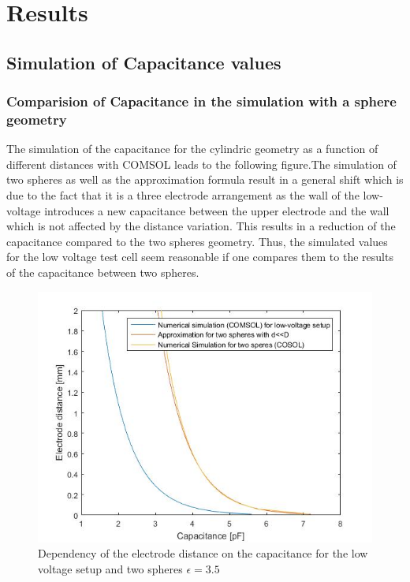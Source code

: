 
\chapter{Results}
\section{Simulation of Capacitance values}
\subsection{Comparision of Capacitance in the simulation with a sphere geometry}
The simulation of the capacitance for the cylindric geometry as a function of different distances with COMSOL leads to the following figure.The simulation of two spheres as well as the approximation formula result in a general 
shift which is due to the fact that it is a three electrode arrangement as the wall of the
low-voltage introduces a new capacitance between the upper electrode and the wall which is not affected by the distance variation. This results in a reduction of the capacitance compared to the 
two spheres geometry. Thus, the simulated values for the low voltage test cell seem reasonable if one compares them to the results of the capacitance between two spheres. \newline 

\begin{figure}[htbp]
	\centering
	\includegraphics[scale=0.3]{figures/Comparison_Low_voltage_Two_spheres}		
	\caption[Kurze Abbildungsbeschreibung]{Dependency of the electrode distance on the capacitance for the low voltage setup and two spheres $\epsilon = 3.5$ } 
	\label{fig.waveforms}
\end{figure}

